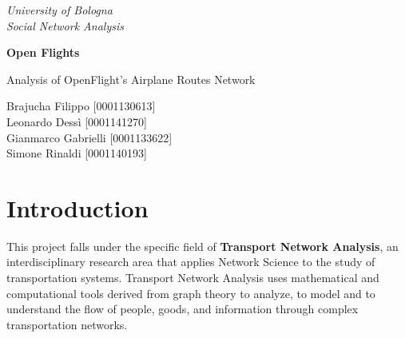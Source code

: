 \documentclass[12pt]{article}
\begin{document}
    \begin{titlepage}

        \begin{center}
        { \textit{University of Bologna} }
            \\
            \vspace{5mm}
            { \textit{Social Network Analysis} }\\
        \end{center}

        \vspace{20mm}

        \begin{center}
        {\LARGE{\textbf{Open Flights}}}
            \\
        \end{center}

        \vspace{20mm}

        \begin{center}
        {\LARGE{Analysis of OpenFlight's Airplane Routes Network}}
            \\
        \end{center}

        \vspace{30mm}

        \begin{center}
        {\large{Brajucha Filippo [0001130613]\\}}
            \vspace{5mm}
            {\large{Leonardo Dessì [0001141270] \\}}
            \vspace{5mm}
            {\large{Gianmarco Gabrielli [0001133622]  \\}}
            \vspace{5mm}
            {\large{Simone Rinaldi [0001140193]\\}}
        \end{center}

        \vspace{40mm}

    \end{titlepage}

    \tableofcontents
    \newpage


    \section{Introduction}\label{sec:introduction}
    This project falls under the specific field of \textbf{Transport Network Analysis}, an interdisciplinary research area that applies Network Science to the study of transportation systems. Transport Network Analysis uses mathematical and computational tools derived from graph theory to analyze, to model and to understand the flow of people, goods, and information through complex transportation networks.
\end{document}
